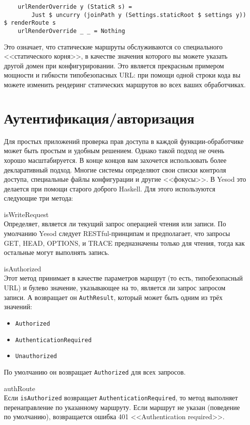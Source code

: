 \begin{lstlisting}
    urlRenderOverride y (StaticR s) =
        Just $ uncurry (joinPath y (Settings.staticRoot $ settings y)) $ renderRoute s
    urlRenderOverride _ _ = Nothing
\end{lstlisting}%

Это означает, что статические маршруты обслуживаются со специального
<<статического корня>>, в качестве значения которого вы можете указать другой
домен при конфигурировании. Это является прекрасным примером мощности и
гибкости типобезопасных URL: при помощи одной строки кода вы можете изменить
рендеринг статических маршрутов во всех ваших обработчиках.

\section {Аутентификация/авторизация}

Для простых приложений проверка прав доступа в каждой функции-обработчике может
быть простым и удобным решением. Однако такой подход не очень хорошо
масштабируется. В конце концов вам захочется использовать более декларативный
подход. Многие системы определяют свои списки контроля доступа, специальные
файлы конфигурации и другие <<фокусы>>. В Yesod это делается при помощи старого
доброго Haskell. Для этого используются следующие три метода:

\begin{description}
  \item {isWriteRequest} \hfill \\
    Определяет, является ли текущий запрос операцией чтения или записи. По
    умолчанию Yesod следует RESTful-принципам и предполагает, что запросы GET,
    HEAD, OPTIONS, и TRACE предназначены только для чтения, тогда как остальные
    могут выполнять запись.

  \item {isAuthorized} \hfill \\
    Этот метод принимает в качестве параметров маршрут (то есть, типобезопасный
    URL) и булево значение, указывающее на то, является ли запрос запросом
    записи. А возвращает он \lstinline!AuthResult!, который может быть одним из
    трёх значений:
    \begin{itemize}
      \item \lstinline!Authorized!
      \item \lstinline!AuthenticationRequired!
      \item \lstinline!Unauthorized!
    \end{itemize}
    По умолчанию он возвращает \lstinline!Authorized! для всех запросов.

  \item {authRoute} \hfill \\
    Если \lstinline!isAuthorized! возвращает
    \lstinline!AuthenticationRequired!, то метод выполняет перенаправление по
    указанному маршруту. Если маршрут не указан (поведение по умолчанию),
    возвращается ошибка 401 <<Authentication required>>.
\end{description}

